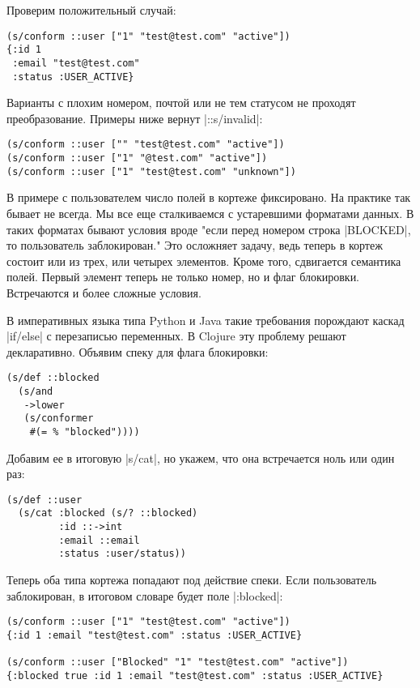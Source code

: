 Проверим положительный случай:

\begin{verbatim}
(s/conform ::user ["1" "test@test.com" "active"])
{:id 1
 :email "test@test.com"
 :status :USER_ACTIVE}
\end{verbatim}

Варианты с плохим номером, почтой или не тем статусом не проходят
преобразование. Примеры ниже вернут \spverb|::s/invalid|:

\begin{verbatim}
(s/conform ::user ["" "test@test.com" "active"])
(s/conform ::user ["1" "@test.com" "active"])
(s/conform ::user ["1" "test@test.com" "unknown"])
\end{verbatim}

В примере с пользователем число полей в кортеже фиксировано. На практике так
бывает не всегда. Мы все еще сталкиваемся с устаревшими форматами данных. В
таких форматах бывают условия вроде "если перед номером строка \spverb|BLOCKED|, то
пользователь заблокирован." Это осложняет задачу, ведь теперь в кортеж состоит
или из трех, или четырех элементов. Кроме того, сдвигается семантика
полей. Первый элемент теперь не только номер, но и флаг блокировки. Встречаются
и более сложные условия.

В императивных языка типа Python и Java такие требования порождают каскад
\spverb|if/else| с перезаписью переменных. В Clojure эту проблему решают
декларативно. Объявим спеку для флага блокировки:

\begin{verbatim}
(s/def ::blocked
  (s/and
   ->lower
   (s/conformer
    #(= % "blocked"))))
\end{verbatim}

Добавим ее в итоговую \spverb|s/cat|, но укажем, что она встречается ноль или один раз:

\begin{verbatim}
(s/def ::user
  (s/cat :blocked (s/? ::blocked)
         :id ::->int
         :email ::email
         :status :user/status))
\end{verbatim}

Теперь оба типа кортежа попадают под действие спеки. Если пользователь
заблокирован, в итоговом словаре будет поле \spverb|:blocked|:

\begin{verbatim}
(s/conform ::user ["1" "test@test.com" "active"])
{:id 1 :email "test@test.com" :status :USER_ACTIVE}

(s/conform ::user ["Blocked" "1" "test@test.com" "active"])
{:blocked true :id 1 :email "test@test.com" :status :USER_ACTIVE}
\end{verbatim}

